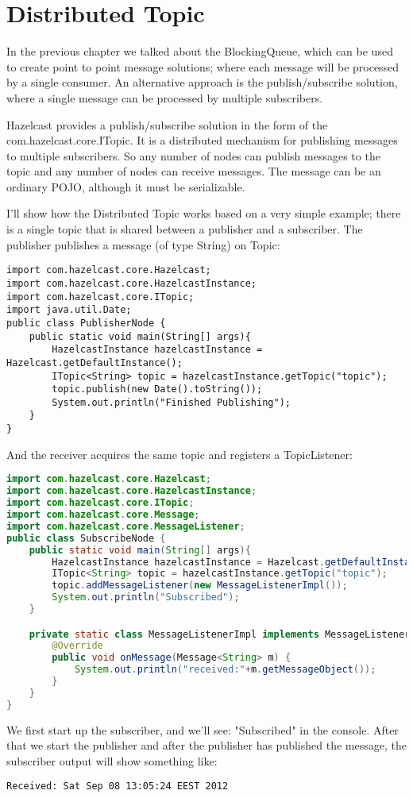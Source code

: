 \chapter{Distributed Topic}
In the previous chapter we talked about the BlockingQueue, which can be used to create point to point message solutions; where each message will be processed by a single consumer. An alternative approach is the publish/subscribe solution, where a single message can be processed by multiple subscribers.

Hazelcast provides a publish/subscribe solution in the form of the com.hazelcast.core.ITopic. It is a distributed mechanism for publishing messages to multiple subscribers. So any number of nodes can publish messages to the topic and any number of nodes can receive messages. The message can be an ordinary POJO, although it must be serializable. 

I'll show how the Distributed Topic works based on a very simple example; there is a single topic that is shared between a publisher and a subscriber. The publisher publishes a message (of type String) on Topic:
\begin{verbatim}
import com.hazelcast.core.Hazelcast;
import com.hazelcast.core.HazelcastInstance;
import com.hazelcast.core.ITopic;
import java.util.Date;
public class PublisherNode {
    public static void main(String[] args){
        HazelcastInstance hazelcastInstance = Hazelcast.getDefaultInstance();
        ITopic<String> topic = hazelcastInstance.getTopic("topic");
        topic.publish(new Date().toString());
        System.out.println("Finished Publishing");
    }
}
\end{verbatim}

And the receiver acquires the same topic and registers a TopicListener:
\begin{lstlisting}[language=java]
import com.hazelcast.core.Hazelcast;
import com.hazelcast.core.HazelcastInstance;
import com.hazelcast.core.ITopic;
import com.hazelcast.core.Message;
import com.hazelcast.core.MessageListener;
public class SubscribeNode {
    public static void main(String[] args){
        HazelcastInstance hazelcastInstance = Hazelcast.getDefaultInstance();
        ITopic<String> topic = hazelcastInstance.getTopic("topic");
        topic.addMessageListener(new MessageListenerImpl());
        System.out.println("Subscribed");
    }

    private static class MessageListenerImpl implements MessageListener<String> {
        @Override
        public void onMessage(Message<String> m) {
            System.out.println("received:"+m.getMessageObject());
        }
    }
}
\end{lstlisting}
We first start up the subscriber, and we'll see: "Subscribed" in the console. After that we start the publisher and after the publisher has published the message, the subscriber output will show something like:
\begin{verbatim}
Received: Sat Sep 08 13:05:24 EEST 2012
\end{verbatim}

